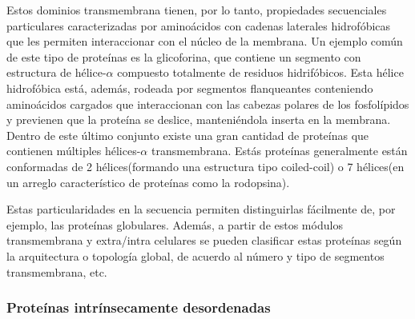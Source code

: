 Estos dominios transmembrana tienen, por lo tanto, propiedades secuenciales particulares caracterizadas por aminoácidos con cadenas laterales hidrofóbicas que les permiten interaccionar con el núcleo de la membrana.
Un ejemplo común de este tipo de proteínas es la glicoforina, que contiene un segmento con estructura de hélice-$\alpha$ compuesto totalmente de residuos hidrifóbicos. 
Esta hélice hidrofóbica está, además, rodeada por segmentos flanqueantes conteniendo aminoácidos cargados que interaccionan con las cabezas polares de los fosfolípidos y previenen que la proteína se deslice,
manteniéndola inserta en la membrana.
Dentro de este último conjunto existe una gran cantidad de proteínas que contienen múltiples hélices-$\alpha$ transmembrana. Estás proteínas generalmente están conformadas de 2 hélices(formando una estructura tipo coiled-coil)
o 7 hélices(en un arreglo característico de proteínas como la rodopsina).

Estas particularidades en la secuencia permiten distinguirlas fácilmente de, por ejemplo, las proteínas globulares. 
Además, a partir de estos módulos transmembrana y extra/intra celulares se pueden clasificar estas proteínas según la arquitectura o topología global, de acuerdo al número y tipo de segmentos transmembrana, etc.



















\subsubsection{Proteínas intrínsecamente desordenadas}


